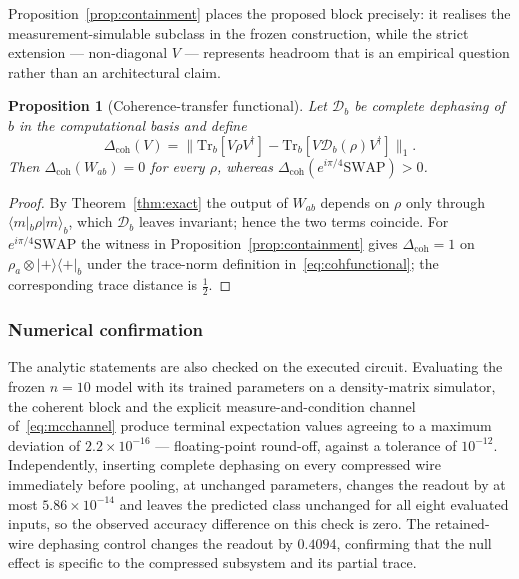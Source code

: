 \documentclass[conference]{IEEEtran}
\newtheorem{proposition}{Proposition}
\begin{document}
Proposition~\ref{prop:containment} places the proposed block precisely: it realises the measurement-simulable subclass in the frozen construction, while the strict extension --- non-diagonal $V$ --- represents headroom that is an empirical question rather than an architectural claim.

\begin{proposition}[Coherence-transfer functional]
\label{prop:coh}
Let $\mathcal{D}_b$ be complete dephasing of $b$ in the computational basis and define
\begin{equation}
\Delta_{\mathrm{coh}}(V) = \big\| \mathrm{Tr}_b[V \rho V^{\dagger}] - \mathrm{Tr}_b[V \mathcal{D}_b(\rho) V^{\dagger}] \big\|_1 .
\label{eq:cohfunctional}
\end{equation}
Then $\Delta_{\mathrm{coh}}(W_{ab}) = 0$ for every $\rho$, whereas $\Delta_{\mathrm{coh}}(e^{i\pi/4}\mathrm{SWAP}) > 0$.
\end{proposition}

\begin{proof}
By Theorem~\ref{thm:exact} the output of $W_{ab}$ depends on $\rho$ only through $\langle m|_b \rho |m\rangle_b$, which $\mathcal{D}_b$ leaves invariant; hence the two terms coincide. For $e^{i\pi/4}\mathrm{SWAP}$ the witness in Proposition~\ref{prop:containment} gives $\Delta_{\mathrm{coh}} = 1$ on $\rho_a \otimes |{+}\rangle\langle{+}|_b$ under the trace-norm definition in~\eqref{eq:cohfunctional}; the corresponding trace distance is $\tfrac{1}{2}$.
\end{proof}

\subsubsection{Numerical confirmation}
The analytic statements are also checked on the executed circuit. Evaluating the frozen $n=10$ model with its trained parameters on a density-matrix simulator, the coherent block and the explicit measure-and-condition channel of~\eqref{eq:mcchannel} produce terminal expectation values agreeing to a maximum deviation of $2.2 \times 10^{-16}$ --- floating-point round-off, against a tolerance of $10^{-12}$. Independently, inserting complete dephasing on every compressed wire immediately before pooling, at unchanged parameters, changes the readout by at most $5.86 \times 10^{-14}$ and leaves the predicted class unchanged for all eight evaluated inputs, so the observed accuracy difference on this check is zero. The retained-wire dephasing control changes the readout by $0.4094$, confirming that the null effect is specific to the compressed subsystem and its partial trace.
\end{document}
